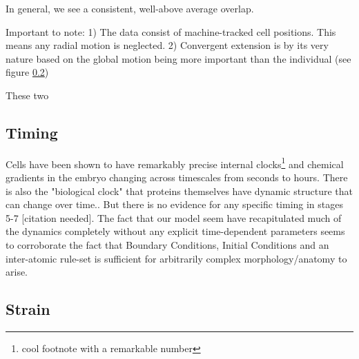 In general, we see a consistent, well-above average overlap. 


Important to note:
1) The data consist of machine-tracked cell positions. This means any radial motion is neglected.
2) Convergent extension is by its very nature based on the global motion being more important than the individual (see figure \ref{}) 

These two 



\subsection{Timing}
Cells have been shown to have remarkably precise internal clocks\footnote{cool footnote with a remarkable number\cite{cellinternal}} and chemical gradients in the embryo changing across timescales from seconds to hours\cite{shvartsman2008dynamics}. There is also the "biological clock"\cite{johanolsen2} that proteins themselves have dynamic structure that can change over time.\cite{johanolsen1}. But there is no evidence for any specific timing in stages 5-7 [citation needed]. The fact that our model seem have recapitulated much of the dynamics completely without any explicit time-dependent parameters seems to corroborate the fact that Boundary Conditions, Initial Conditions and an inter-atomic rule-set is sufficient for arbitrarily complex morphology/anatomy to arise. 


\subsection{Strain}

